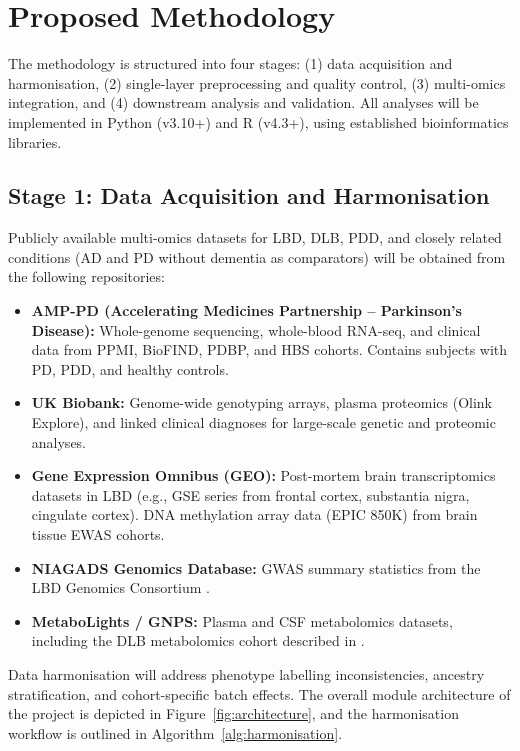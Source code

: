 \section{Proposed Methodology}
\label{sec:methodology}

The methodology is structured into four stages: (1) data acquisition and harmonisation, (2) single-layer preprocessing and quality control, (3) multi-omics integration, and (4) downstream analysis and validation. All analyses will be implemented in Python (v3.10+) and R (v4.3+), using established bioinformatics libraries.

\subsection{Stage 1: Data Acquisition and Harmonisation}

Publicly available multi-omics datasets for LBD, DLB, PDD, and closely related conditions (AD and PD without dementia as comparators) will be obtained from the following repositories:

\begin{itemize}
    \item \textbf{AMP-PD (Accelerating Medicines Partnership -- Parkinson's Disease):} Whole-genome sequencing, whole-blood RNA-seq, and clinical data from PPMI, BioFIND, PDBP, and HBS cohorts. Contains subjects with PD, PDD, and healthy controls.
    \item \textbf{UK Biobank:} Genome-wide genotyping arrays, plasma proteomics (Olink Explore), and linked clinical diagnoses for large-scale genetic and proteomic analyses.
    \item \textbf{Gene Expression Omnibus (GEO):} Post-mortem brain transcriptomics datasets in LBD (e.g., GSE series from frontal cortex, substantia nigra, cingulate cortex). DNA methylation array data (EPIC 850K) from brain tissue EWAS cohorts.
    \item \textbf{NIAGADS Genomics Database:} GWAS summary statistics from the LBD Genomics Consortium \cite{chia2025gwas, chia2021lbd}.
    \item \textbf{MetaboLights / GNPS:} Plasma and CSF metabolomics datasets, including the DLB metabolomics cohort described in \cite{frontiers2024metabolomics}.
\end{itemize}

Data harmonisation will address phenotype labelling inconsistencies, ancestry stratification, and cohort-specific batch effects. The overall module architecture of the project is depicted in Figure~\ref{fig:architecture}, and the harmonisation workflow is outlined in Algorithm~\ref{alg:harmonisation}.

